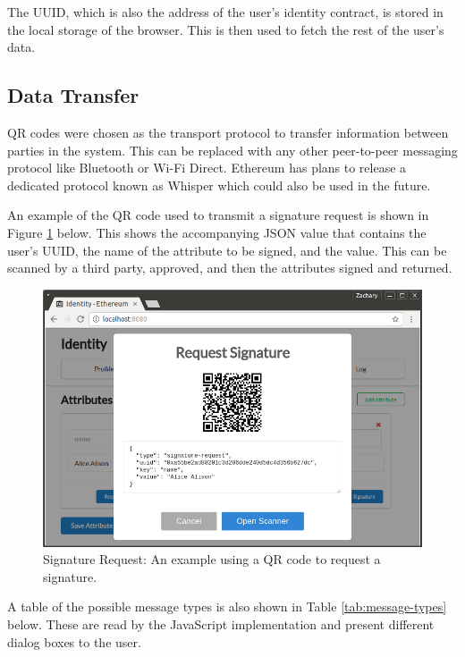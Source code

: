 The \ac{UUID}, which is also the address of the user's identity contract, is stored in the local storage of the browser. This is then used to fetch the rest of the user's data.

\subsection{Data Transfer}
\label{sec:data-transfer}
QR codes were chosen as the transport protocol to transfer information between parties in the system. This can be replaced with any other peer-to-peer messaging protocol like Bluetooth or Wi-Fi Direct. Ethereum has plans to release a dedicated protocol known as Whisper  \cite{ethereum_foundation_whisper_nodate} which could also be used in the future.

An example of the QR code used to transmit a signature request is shown in Figure \ref{fig:signature-request} below. This shows the accompanying \ac{JSON} value that contains the user's \ac{UUID}, the name of the attribute to be signed, and the value. This can be scanned by a third party, approved, and then the attributes signed and returned.

\begin{figure}[ht]
\centering
     \includegraphics[width=1.0\textwidth]{./images/SignatureRequest.png}
      \caption{Signature Request: An example using a QR code to request a signature.}
       \label{fig:signature-request}
\end{figure}

A table of the possible message types is also shown in Table \ref{tab:message-types} below. These are read by the JavaScript implementation and present different dialog boxes to the user.

